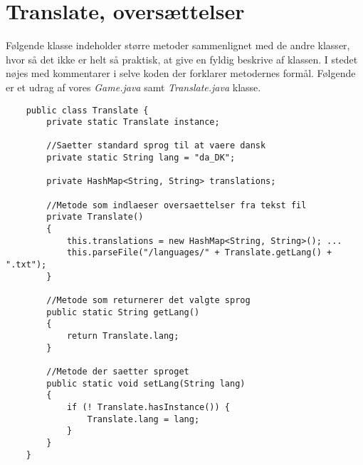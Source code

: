 \section{Translate, oversættelser}
\noindent Følgende klasse indeholder større metoder sammenlignet med de andre klasser, hvor så det ikke er helt så praktisk, at give en fyldig beskrive af klassen.
I stedet nøjes med kommentarer i selve koden der forklarer metodernes formål.
Følgende er et udrag af vores \textit{Game.java} samt \textit{Translate.java} klasse.
\begin{lstlisting}
    public class Translate {
        private static Translate instance;
        
        //Saetter standard sprog til at vaere dansk
        private static String lang = "da_DK";
        
        private HashMap<String, String> translations;

        //Metode som indlaeser oversaettelser fra tekst fil
        private Translate()
        {
            this.translations = new HashMap<String, String>(); ...
            this.parseFile("/languages/" + Translate.getLang() + ".txt");
        }
        
        //Metode som returnerer det valgte sprog 
        public static String getLang()
        {
            return Translate.lang;
        }
        
        //Metode der saetter sproget
        public static void setLang(String lang)
        {
            if (! Translate.hasInstance()) {
                Translate.lang = lang;
            }
        }
    }
\end{lstlisting}
\vspace{2ex}
